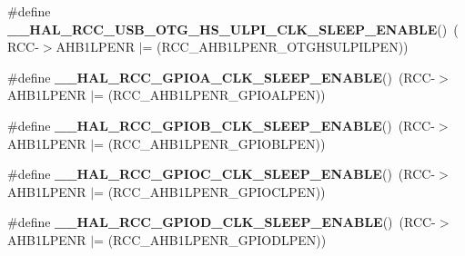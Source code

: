 \begin{DoxyCompactItemize}
\item 
\mbox{\label{group___r_c_c_ex___peripheral___clock___sleep___enable___disable_gac62a3a9510d500e6ed32dc925f7ef028}} 
\#define {\bfseries \+\_\+\+\_\+\+H\+A\+L\+\_\+\+R\+C\+C\+\_\+\+U\+S\+B\+\_\+\+O\+T\+G\+\_\+\+H\+S\+\_\+\+U\+L\+P\+I\+\_\+\+C\+L\+K\+\_\+\+S\+L\+E\+E\+P\+\_\+\+E\+N\+A\+B\+LE}()~(R\+CC-\/$>$A\+H\+B1\+L\+P\+E\+NR $\vert$= (R\+C\+C\+\_\+\+A\+H\+B1\+L\+P\+E\+N\+R\+\_\+\+O\+T\+G\+H\+S\+U\+L\+P\+I\+L\+P\+EN))
\item 
\mbox{\label{group___r_c_c_ex___peripheral___clock___sleep___enable___disable_gaff8820b47bd3764e7cded76b9368460b}} 
\#define {\bfseries \+\_\+\+\_\+\+H\+A\+L\+\_\+\+R\+C\+C\+\_\+\+G\+P\+I\+O\+A\+\_\+\+C\+L\+K\+\_\+\+S\+L\+E\+E\+P\+\_\+\+E\+N\+A\+B\+LE}()~(R\+CC-\/$>$A\+H\+B1\+L\+P\+E\+NR $\vert$= (R\+C\+C\+\_\+\+A\+H\+B1\+L\+P\+E\+N\+R\+\_\+\+G\+P\+I\+O\+A\+L\+P\+EN))
\item 
\mbox{\label{group___r_c_c_ex___peripheral___clock___sleep___enable___disable_ga0e718efc965ab07752cd865c3f33551a}} 
\#define {\bfseries \+\_\+\+\_\+\+H\+A\+L\+\_\+\+R\+C\+C\+\_\+\+G\+P\+I\+O\+B\+\_\+\+C\+L\+K\+\_\+\+S\+L\+E\+E\+P\+\_\+\+E\+N\+A\+B\+LE}()~(R\+CC-\/$>$A\+H\+B1\+L\+P\+E\+NR $\vert$= (R\+C\+C\+\_\+\+A\+H\+B1\+L\+P\+E\+N\+R\+\_\+\+G\+P\+I\+O\+B\+L\+P\+EN))
\item 
\mbox{\label{group___r_c_c_ex___peripheral___clock___sleep___enable___disable_gac62505cc695d985fcf18ca1fd2f1a421}} 
\#define {\bfseries \+\_\+\+\_\+\+H\+A\+L\+\_\+\+R\+C\+C\+\_\+\+G\+P\+I\+O\+C\+\_\+\+C\+L\+K\+\_\+\+S\+L\+E\+E\+P\+\_\+\+E\+N\+A\+B\+LE}()~(R\+CC-\/$>$A\+H\+B1\+L\+P\+E\+NR $\vert$= (R\+C\+C\+\_\+\+A\+H\+B1\+L\+P\+E\+N\+R\+\_\+\+G\+P\+I\+O\+C\+L\+P\+EN))
\item 
\mbox{\label{group___r_c_c_ex___peripheral___clock___sleep___enable___disable_ga5f04963ee5709230888d50574008372f}} 
\#define {\bfseries \+\_\+\+\_\+\+H\+A\+L\+\_\+\+R\+C\+C\+\_\+\+G\+P\+I\+O\+D\+\_\+\+C\+L\+K\+\_\+\+S\+L\+E\+E\+P\+\_\+\+E\+N\+A\+B\+LE}()~(R\+CC-\/$>$A\+H\+B1\+L\+P\+E\+NR $\vert$= (R\+C\+C\+\_\+\+A\+H\+B1\+L\+P\+E\+N\+R\+\_\+\+G\+P\+I\+O\+D\+L\+P\+EN))

\end{DoxyCompactItemize}
